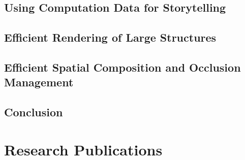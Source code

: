
%
%
%
%
% 
%
%
%
%


\section{Using Computation Data for Storytelling}

\section{Efficient Rendering of Large Structures}

\section{Efficient Spatial Composition and Occlusion Management}




\section{Conclusion}

\chapter{Research Publications}



